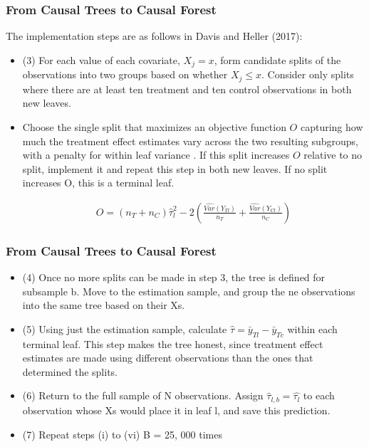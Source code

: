 \documentclass[
  shownotes,
  xcolor={svgnames},
  hyperref={colorlinks,citecolor=DarkBlue,linkcolor=DarkRed,urlcolor=DarkBlue}
  , aspectratio=169]{beamer}
\begin{document}
\begin{frame}[fragile]
\frametitle{From Causal Trees to Causal Forest}


The implementation steps are as follows in Davis and Heller (2017):
\medskip
\begin{itemize}


\item (3) For each value of each covariate, $X_j = x$, form candidate splits of the observations into two groups based on whether $X_j \leq x$. Consider only splits where there are at least ten treatment and ten control observations in both new leaves. 
\item Choose the single split that maximizes an objective function $O$ capturing how much the treatment effect estimates vary across the two resulting subgroups, with a penalty for within leaf variance . If this split increases $O$ relative to no split, implement it and repeat this step in both new leaves. If no split increases O, this is a terminal leaf.

\begin{align}
O = (n_T + n_C)\hat{\tau}^2_l - 2 \left(\frac{\hat{Var}(Y_{Tl})}{n_T}+\frac{\hat{Var}(Y_{Cl})}{n_C}\right)
\end{align}
\medskip

\end{itemize}
\end{frame}
\begin{frame}[fragile]
\frametitle{From Causal Trees to Causal Forest}

\begin{itemize}

\item (4) Once no more splits can be made in step 3, the tree is defined for subsample b. Move to the estimation sample, and group the ne observations into the same tree based on their Xs.
\medskip

\item (5) Using just the estimation sample, calculate $\hat{\tau}=\bar{y}_{Tl}-\bar{y}_{Tc}$ within each terminal leaf. This step makes the tree honest, since treatment effect estimates are made using different observations than the ones that determined the splits.
\medskip

\item (6) Return to the full sample of N observations. Assign $\hat{\tau}_{l,b}=\hat{\tau_l}$ to each observation whose Xs would place it in leaf l, and save this prediction.
\medskip
\item (7) Repeat steps (i) to (vi) B = 25, 000 times


\end{itemize}
\end{frame}
\end{document}
